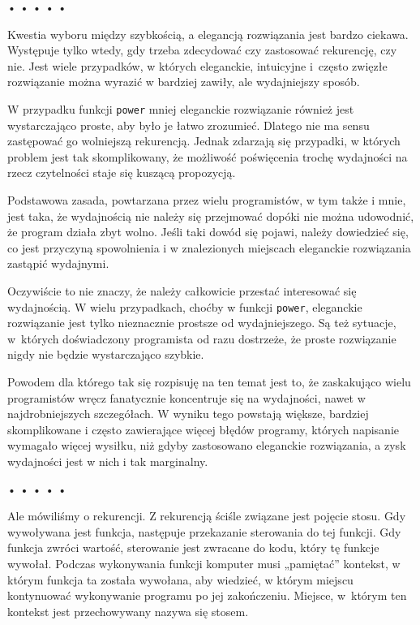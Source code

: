   
  
\begin{center}
• • • • •
\end{center}
  
    
Kwestia wyboru między szybkością, a elegancją rozwiązania jest bardzo ciekawa. Występuje tylko wtedy, gdy trzeba zdecydować czy zastosować rekurencję, czy nie. Jest wiele przypadków, w których eleganckie, intuicyjne i~często zwięzłe rozwiązanie można wyrazić w bardziej zawiły, ale wydajniejszy sposób.

    
W przypadku funkcji \texttt{power} mniej eleganckie rozwiązanie również jest wystarczająco proste, aby było je łatwo zrozumieć. Dlatego nie ma sensu zastępować go wolniejszą rekurencją. Jednak zdarzają się przypadki, w których problem jest tak skomplikowany, że możliwość poświęcenia trochę wydajności na rzecz czytelności staje się kuszącą propozycją.

    
Podstawowa zasada, powtarzana przez wielu programistów, w tym także i mnie, jest taka, że wydajnością nie należy się przejmować dopóki nie można udowodnić, że program działa zbyt wolno. Jeśli taki dowód się pojawi, należy dowiedzieć się, co jest przyczyną spowolnienia i w znalezionych miejscach eleganckie rozwiązania zastąpić wydajnymi.

    
Oczywiście to nie znaczy, że należy całkowicie przestać interesować się wydajnością. W wielu przypadkach, choćby w funkcji \texttt{power}, eleganckie rozwiązanie jest tylko nieznacznie prostsze od wydajniejszego. Są też sytuacje, w~których doświadczony programista od razu dostrzeże, że proste rozwiązanie nigdy nie będzie wystarczająco szybkie.

    
Powodem dla którego tak się rozpisuję na ten temat jest to, że zaskakująco wielu programistów wręcz fanatycznie koncentruje się na wydajności, nawet w najdrobniejszych szczegółach. W wyniku tego powstają większe, bardziej skomplikowane i często zawierające więcej błędów programy, których napisanie wymagało więcej wysiłku, niż gdyby zastosowano eleganckie rozwiązania, a zysk wydajności jest w nich i tak marginalny.

  
  
\begin{center}
• • • • •
\end{center}
  
    
Ale mówiliśmy o rekurencji. Z rekurencją ściśle związane jest pojęcie stosu. Gdy wywoływana jest funkcja, następuje przekazanie sterowania do tej funkcji. Gdy funkcja zwróci wartość, sterowanie jest zwracane do kodu, który tę funkcje wywołał. Podczas wykonywania funkcji komputer musi „pamiętać” kontekst, w którym funkcja ta została wywołana, aby wiedzieć, w którym miejscu kontynuować wykonywanie programu po jej zakończeniu. Miejsce, w~którym ten kontekst jest przechowywany nazywa się stosem.

